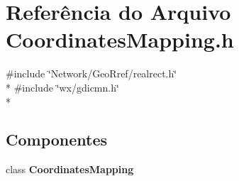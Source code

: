 \section{Referência do Arquivo Coordinates\+Mapping.\+h}
\label{_coordinates_mapping_8h}
{\ttfamily \#include \char`\"{}Network/\+Geo\+Rref/realrect.\+h\char`\"{}}\\*
{\ttfamily \#include \char`\"{}wx/gdicmn.\+h\char`\"{}}\\*
\subsection*{Componentes}
\begin{DoxyCompactItemize}
\item 
class {\bf Coordinates\+Mapping}
\end{DoxyCompactItemize}
